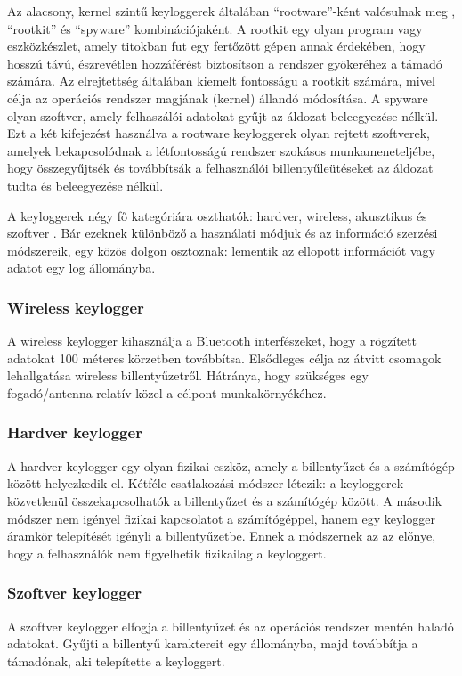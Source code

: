 \documentclass[a4paper, 11pt]{article}
\begin{document}
Az alacsony, kernel szintű keyloggerek általában ``rootware''-ként valósulnak meg \cite{butler2006r2}, ``rootkit'' és ``spyware'' kombinációjaként. A rootkit egy olyan program vagy eszközkészlet, amely titokban fut egy fertőzött gépen annak érdekében, hogy hosszú távú, észrevétlen hozzáférést biztosítson a rendszer gyökeréhez a támadó számára. Az elrejtettség általában kiemelt fontosságu a rootkit számára, mivel célja az operációs rendszer magjának (kernel) állandó módosítása. A spyware olyan szoftver, amely felhaszálói adatokat gyűjt az áldozat beleegyezése nélkül. Ezt a két kifejezést használva a rootware keyloggerek olyan rejtett szoftverek, amelyek bekapcsolódnak a létfontosságú rendszer szokásos munkameneteljébe, hogy összegyűjtsék és továbbítsák a felhasználói billentyűleütéseket az áldozat tudta és beleegyezése nélkül.

A keyloggerek négy fő kategóriára oszthatók: hardver, wireless, akusztikus és szoftver \cite{ahmed2014survey}. Bár ezeknek különböző a használati módjuk és az információ szerzési módszereik, egy közös dolgon osztoznak: lementik az ellopott információt vagy adatot egy log állományba.

\subsubsection{Wireless keylogger}
\cite{ahmed2014survey} A wireless keylogger kihasználja a Bluetooth interfészeket, hogy a rögzített adatokat 100 méteres körzetben továbbítsa. Elsődleges célja az átvitt csomagok lehallgatása wireless billentyűzetről. Hátránya, hogy szükséges egy fogadó/antenna relatív közel a célpont munkakörnyékéhez.

\subsubsection{Hardver keylogger}
\cite{ahmed2014survey} A hardver keylogger egy olyan fizikai eszköz, amely a billentyűzet és a számítógép között helyezkedik el. Kétféle csatlakozási módszer létezik: a keyloggerek közvetlenül összekapcsolhatók a billentyűzet és a számítógép között. A második módszer nem igényel fizikai kapcsolatot a számítógéppel, hanem egy keylogger áramkör telepítését igényli a billentyűzetbe. Ennek a módszernek az az előnye, hogy a felhasználók nem figyelhetik fizikailag a keyloggert.

\subsubsection{Szoftver keylogger}
\cite{ahmed2014survey} A szoftver keylogger elfogja a billentyűzet és az operációs rendszer mentén haladó adatokat. Gyűjti a billentyű karaktereit egy állományba, majd továbbítja a támadónak, aki telepítette a keyloggert.
\end{document}
